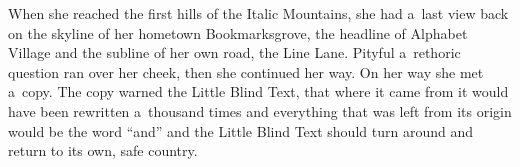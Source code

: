 \documentclass[11pt, a4paper, oneside]{article}
\theoremstyle{Plain}
\theoremstyle{Definition}
\theoremstyle{Remark}
\begin{document}
When she reached the first hills of the Italic Mountains, she had a~last view back on the skyline of her hometown Bookmarksgrove, the headline of Alphabet Village and the subline of her own road, the Line Lane. Pityful a~rethoric question ran over her cheek, then she continued her way. On her way she met a~copy. The copy warned the Little Blind Text, that where it came from it would have been rewritten a~thousand times and everything that was left from its origin would be the word ``and'' and the Little Blind Text should turn around and return to its own, safe country.



\clearpage
{}
\begin{refcontext}[sorting=nyt]  %
	\printbibliography[heading=bibintoc]
\end{refcontext}


\end{document}
